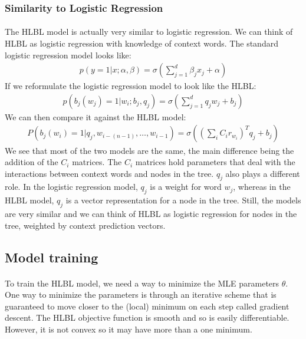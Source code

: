 \documentclass[12pt]{ociamthesis}  %
\begin{document}
\subsubsection{Similarity to Logistic Regression}
\paragraph{}
The HLBL model is actually very similar to logistic regression. We can think of HLBL as logistic regression with knowledge of context words. 
The standard logistic regression model looks like:
\begin{align}
p(y =1 | x; \alpha, \beta) = \sigma \left( \sum_{j=1}^d \beta_j x_j + \alpha \right)
\end{align}
If we reformulate the logistic regression model to look like the HLBL:
\begin{align}
p( b_j(w_j) = 1 | w_i; b_j, q_j) = \sigma \left( \sum_{j=1}^d q_j w_j + b_j \right)
\end{align}
We can then compare it against the HLBL model:
\begin{align}
P(b_j(w_i) = 1 | q_j, w_{i-(n-1)},\dots, w_{i-1}) =  \sigma( (\sum_i C_i r_{w_i})^T q_{j} +b_{j})
\end{align}
We see that most of the two models are the same, the main difference being the addition of the $C_i$ matrices.  The $C_i$ matrices hold parameters that deal with the interactions between context words and nodes in the tree. $q_j$ also plays a different role. In the logistic regression model, $q_j$ is a weight for word $w_j$, whereas in the HLBL model, $q_j$ is a vector representation for a node in the tree. Still, the models are very similar and we can think of HLBL as logistic regression for nodes in the tree, weighted by context prediction vectors.


\subsection{Model training}
\paragraph{}
To train the HLBL model, we need a way to minimize the MLE parameters $\hat{\theta}$. One way to minimize the parameters is through an iterative scheme that is guaranteed to move closer to the (local) minimum on each step called gradient descent. The HLBL objective function is smooth and so is easily differentiable. However, it is not convex so it may have more than a one minimum. 
\end{document}
